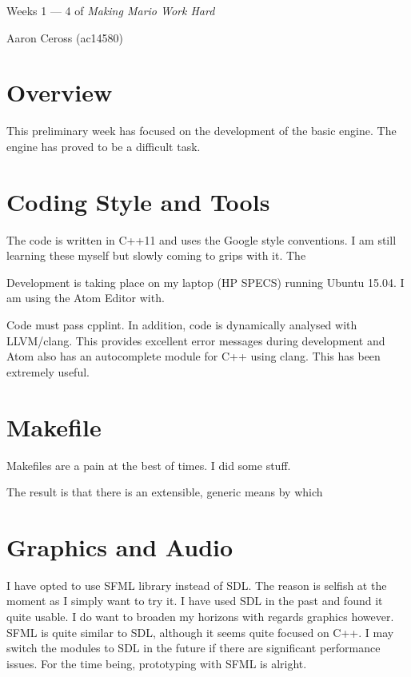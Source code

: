 \documentclass[11pt, a4paper, oneside]{article} %
\begin{document}
\begin{center}\huge Weeks 1 --- 4 of \textit{Making Mario Work Hard}
\par \Large Aaron Ceross (ac14580)
\end{center}


\section{Overview}
This preliminary week has focused on the development of the basic engine. The
engine has proved to be a difficult task.

\section{Coding Style and Tools}

The code is written in C++11 and uses the Google style conventions. I am still
learning these myself but slowly coming to grips with it. The

\par

Development is taking place on my laptop (HP SPECS) running Ubuntu 15.04. I am
using the Atom Editor with.

Code must pass cpplint. In addition, code is dynamically analysed with
LLVM/clang. This provides excellent error messages during development and Atom
also has an autocomplete module for C++ using clang. This has been extremely
useful.

\section{Makefile}

Makefiles are a pain at the best of times. I did some stuff.

The result is that there is an extensible, generic means by which

\section{Graphics and Audio}

I have opted to use SFML library instead of SDL. The reason is selfish at the
moment as I simply want to try it. I have used SDL in the past and found it
quite usable. I do want to broaden my horizons with regards graphics however.
\tabularnewline
SFML is quite similar to SDL, although it seems quite focused on C++. I may
switch the modules to SDL in the future if there are significant performance
issues. For the time being, prototyping with SFML is alright.
\end{document}
